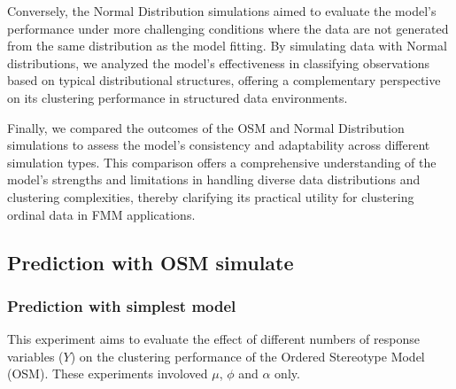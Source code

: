 \documentclass{article}
\begin{document}
Conversely, the Normal Distribution simulations aimed to evaluate the model’s performance under more challenging conditions where the data are not generated from the same distribution as the model fitting. By simulating data with Normal distributions, we analyzed the model’s effectiveness in classifying observations based on typical distributional structures, offering a complementary perspective on its clustering performance in structured data environments.

Finally, we compared the outcomes of the OSM and Normal Distribution simulations to assess the model’s consistency and adaptability across different simulation types. This comparison offers a comprehensive understanding of the model’s strengths and limitations in handling diverse data distributions and clustering complexities, thereby clarifying its practical utility for clustering ordinal data in FMM applications.
\subsection{Prediction with OSM simulate}

\subsubsection{Prediction with simplest model}

This experiment aims to evaluate the effect of different numbers of response variables (\( Y \)) on the clustering performance of the Ordered Stereotype Model (OSM). These experiments involoved $\mu$, $\phi$ and $\alpha$ only.
\end{document}
